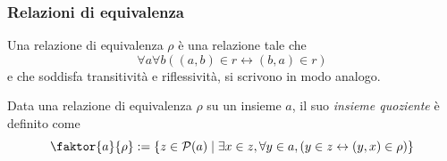 \documentclass[11pt]{scrartcl}
\newcommand{\parti}[1]{\mathcal{P}\!\left(#1\right)}
\begin{document}
	\subsubsection{Relazioni di equivalenza}
	\begin{definition}
		Una relazione di equivalenza $\rho$ è una relazione tale che
		$$\forall a\forall b((a,b)\in r \leftrightarrow (b,a)\in r)$$
		e che soddisfa transitività e riflessività, si scrivono in modo analogo.
	\end{definition}
	\begin{definition}
		Data una relazione di equivalenza $\rho$ su un insieme $a$, il suo \textit{insieme quoziente} è definito come
		$$\faktor{a}{\rho}:=\left\{z\in \parti{a}\mid \exists x\in z,\forall y\in a ,\left(y\in z \leftrightarrow (y,x)\in \rho\right)\right\}$$
	\end{definition}
\end{document}
